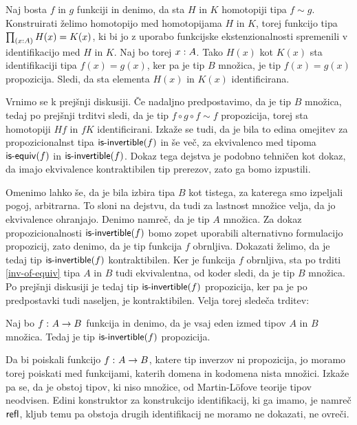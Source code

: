 \begin{dokaz}
  Naj bosta \(f\) in \(g\) funkciji in denimo, da sta \(H\) in \(K\) homotopiji tipa \(f \sim g\). Konstruirati želimo homotopijo med homotopijama \(H\) in \(K\), torej funkcijo tipa
  \(\textstyle \prod_{\left( x : A \right)} H(x) = K(x)\), ki bi jo z uporabo funkcijske ekstenzionalnosti spremenili v identifikacijo med \(H\) in \(K\). Naj bo torej \(x : A\).
  Tako \(H(x)\) kot \(K(x)\) sta identifikaciji tipa \(f(x) = g(x)\), ker pa je tip \(B\) množica, je tip \(f(x) = g(x)\) propozicija. Sledi, da sta elementa \(H(x)\) in \(K(x)\) identificirana.
\end{dokaz}

Vrnimo se k prejšnji diskusiji. Če nadaljno predpostavimo, da je tip \(B\) množica, tedaj po prejšnji trditvi sledi, da je tip \(f \circ g \circ f \sim f\) propozicija, torej sta homotopiji \(Hf\) in \(fK\) identificirani. Izkaže se tudi, da je bila to edina omejitev za propozicionalnst tipa \(\textnormal{\textsf{is-invertible}}(f)\) in še več, za ekvivalenco med tipoma \(\textnormal{\textsf{is-equiv}}(f)\) in \(\textnormal{\textsf{is-invertible}}(f)\). Dokaz tega dejstva je podobno tehničen kot dokaz, da imajo ekvivalence kontraktibilen tip prerezov, zato ga bomo izpustili.

Omenimo lahko še, da je bila izbira tipa \(B\) kot tistega, za katerega smo izpeljali pogoj, arbitrarna. To sloni na dejstvu, da tudi za lastnost množice velja, da jo ekvivalence ohranjajo. Denimo namreč, da je tip \(A\) množica. Za dokaz propozicionalnosti \(\textnormal{\textsf{is-invertible}}(f)\) bomo zopet uporabili alternativno formulacijo propozicij, zato denimo, da je tip funkcija \(f\) obrnljiva. Dokazati želimo, da je tedaj tip \(\textnormal{\textsf{is-invertible}}(f)\) kontraktibilen. Ker je funkcija \(f\) obrnljiva, sta po trditi \ref{inv-of-equiv} tipa \(A\) in \(B\) tudi ekvivalentna, od koder sledi, da je tip \(B\) množica. Po prejšnji diskusiji je tedaj tip \(\textnormal{\textsf{is-invertible}}(f)\) propozicija, ker pa je po predpostavki tudi naseljen, je kontraktibilen. Velja torej sledeča trditev:

\begin{izrek}
  Naj bo \(f \,\colon A \to B\) funkcija in denimo, da je vsaj eden izmed tipov \(A\) in \(B\) množica. Tedaj je tip \(\textnormal{\textsf{is-invertible}}(f)\) propozicija.
\end{izrek}

Da bi poiskali funkcijo \(f \,\colon A \to B\), katere tip inverzov ni propozicija, jo moramo torej poiskati med funkcijami, katerih domena in kodomena nista množici. Izkaže pa se, da je obstoj tipov, ki niso množice, od Martin-Löfove teorije tipov neodvisen. Edini konstruktor za konstrukcijo identifikacij, ki ga imamo, je namreč \(\textnormal{\textsf{refl}}_{}\), kljub temu pa obstoja drugih identifikacij ne moramo ne dokazati, ne ovreči.


